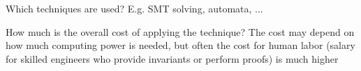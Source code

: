 \documentclass[a4paper]{article}
\begin{document}
\begin{minipage}[t]{0.16\linewidth}
\begin{betterlist}
\begin{betterlist}
			\item Which techniques are used? E.g. SMT solving, automata, ...

			\item How much is the overall cost of applying the technique? The cost may depend on how much computing power is needed, but often the cost for human labor (salary for skilled engineers who provide invariants or perform proofs) is much higher
		\end{betterlist}
	\end{betterlist}
\end{minipage}
\end{document}
